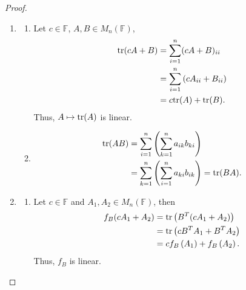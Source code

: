 \documentclass[11pt]{book}
\theoremstyle{definition}
\numberwithin{equation}{chapter}
\begin{document}
\begin{proof}
~\begin{enumerate}[label=(\alph*)]
    \item \begin{enumerate}[label=\arabic*)]
        \item Let $c \in \mathbb{F}$, $A, B \in M_n(\mathbb{F})$, 
        \begin{align*}
            {\rm tr}(cA + B) & = \sum^n_{i=1} (cA + B)_{ii} \\
            & = \sum^n_{i=1} \left(cA_{ii} + B_{ii}\right) \\
            & = c {\rm tr}(A) + {\rm tr}(B).
        \end{align*}
        Thus, $A \mapsto {\rm tr}(A)$ is linear.
        
        \item 
        \begin{align*}
            {\rm tr}(AB) & = \sum^n_{i=1}\left(\sum^n_{k=1} a_{ik} b_{ki}\right) \\
            & = \sum^n_{k=1}\left(\sum^n_{i=1} a_{ki} b_{ik}\right) = {\rm tr}(BA).
        \end{align*}
    \end{enumerate}
    
    \item \begin{enumerate}[label=\arabic*)]
        \item Let $c \in \mathbb{F}$ and $A_1, A_2 \in  M_n(\mathbb{F})$, then
        \begin{align*}
            f_B(cA_1 + A_2) & = {\rm tr}\left(B^T (cA_1 + A_2)\right) \\
            & = {\rm tr}\left(c B^T A_1 + B^T A_2\right) \\
            & = c f_B\left(A_1\right) + f_B\left(A_2\right).
        \end{align*}
        Thus, $f_B$ is linear.
        

\end{enumerate}
\end{enumerate}
\end{proof}
\end{document}
